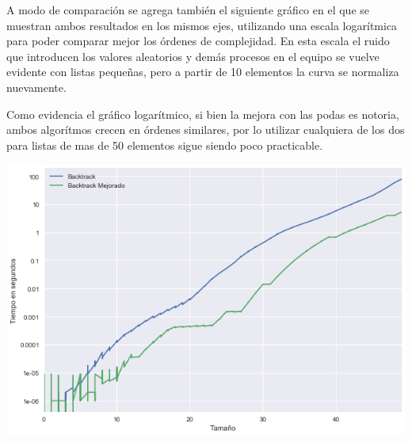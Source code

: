 	A modo de comparación se agrega también el siguiente gráfico en el que se muestran ambos resultados en los mismos ejes, utilizando una escala logarítmica para poder comparar mejor los órdenes de complejidad. En esta escala el ruido que introducen los valores aleatorios y demás procesos en el equipo se vuelve evidente con listas pequeñas, pero a partir de 10 elementos la curva se normaliza nuevamente.

	Como evidencia el gráfico logarítmico, si bien la mejora con las podas es notoria, ambos algorítmos crecen en órdenes similares, por lo utilizar cualquiera de los dos para listas de mas de 50 elementos sigue siendo poco practicable.

	\begin{center}
	\includegraphics[width=.8\textwidth]{ej2-2.png}
	\end{center}